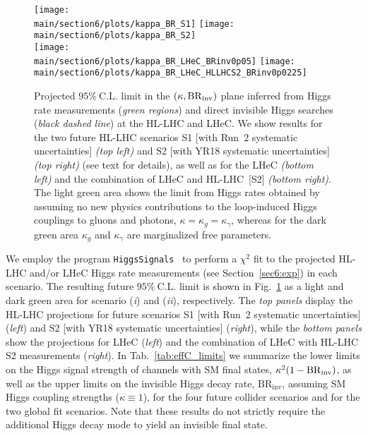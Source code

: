 \documentclass[../report.tex]{subfiles}
\providecommand{\main}{..}
\begin{document}
\begin{figure}
\centering
\texttt{[image: \\main/section6/plots/kappa\_BR\_S1]}
\hfill
\texttt{[image: \\main/section6/plots/kappa\_BR\_S2]}\\
\texttt{[image: \\main/section6/plots/kappa\_BR\_LHeC\_BRinv0p05]}
\hfill
\texttt{[image: \\main/section6/plots/kappa\_BR\_LHeC\_HLLHCS2\_BRinv0p0225]}
\caption{Projected $95\%~\mathrm{C.L.}$ limit in the $(\kappa, \mathrm{BR}_\mathrm{inv})$ plane inferred from Higgs rate measurements (\emph{green regions}) and direct invisible Higgs searches (\emph{black dashed line}) at the HL-LHC and LHeC. We show results for the two future HL-LHC scenarios S1 [with Run~2 systematic uncertainties] {\sl (top left)} and S2 [with YR18 systematic uncertainties] {\sl (top right)} (see text for details), as well as for the LHeC {\sl (bottom left)} and the combination of LHeC and HL-LHC~[S2] {\sl (bottom right)}. The light green area shows the limit from Higgs rates obtained by assuming no new physics contributions to the loop-induced Higgs couplings to gluons and photons, $\kappa = \kappa_g = \kappa_\gamma$, whereas for the dark green area $\kappa_g$ and $\kappa_\gamma$ are marginalized free parameters.}
\label{fig:effC}
\end{figure}

We employ the program \texttt{HiggsSignals}~\cite{Bechtle:2013xfa,Bechtle:2014ewa} to perform a $\chi^2$ fit to the projected HL-LHC {and/or LHeC} Higgs rate measurements (see Section~\ref{sec6:exp})  in each scenario. The resulting future $95\%~\mathrm{C.L.}$ limit is shown in Fig.~\ref{fig:effC} as a light and dark green area for scenario (\emph{i}) and (\emph{ii}), respectively. {The \emph{top panels} display the HL-LHC projections for future scenarios S1 [with Run~2 systematic uncertainties] (\emph{left}) and S2 [with YR18 systematic uncertainties] (\emph{right}), while the \emph{bottom panels} show the projections for LHeC (\emph{left}) and the combination of LHeC with HL-LHC S2 measurements (\emph{right}).} {In Tab.~\ref{tab:effC_limits} we summarize the lower limits on the Higgs signal strength of channels with SM final states, $\kappa^2 (1-\mathrm{BR}_\mathrm{inv})$, as well as the upper limits on the invisible Higgs decay rate, $\mathrm{BR}_\text{inv}$, assuming SM Higgs coupling strengths ($\kappa \equiv 1$), for the four future collider scenarios and for the two global fit scenarios.} Note that these results do not strictly require the additional Higgs decay mode to yield an invisible final state.
\end{document}
